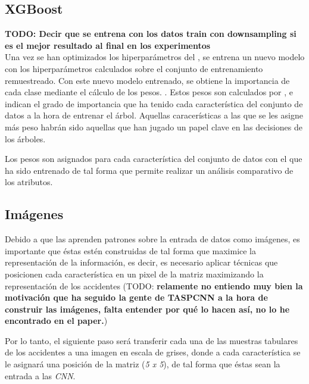 
    \subsection{XGBoost}


        \textbf{TODO: Decir que se entrena con los datos train con downsampling si es el mejor resultado al final en los experimentos}\\

        Una vez se han optimizados los hiperparámetros del , se entrena un nuevo modelo con los hiperparámetros calculados sobre el conjunto de entrenamiento remuestreado. Con este nuevo modelo  entrenado, se obtiene la importancia de cada clase mediante el cálculo de los pesos. \cite{XGBoostFeatureWeightsMeaning}. Estos pesos son calculados por , e indican el grado de importancia que ha tenido cada característica del conjunto de datos a la hora de entrenar el árbol. Aquellas caracerísticas a las que se les asigne más peso habrán sido aquellas que han jugado un papel clave en las decisiones de los árboles.

        Los pesos son asignados para cada característica del conjunto de datos con el que ha sido entrenado  de tal forma que permite realizar un análisis comparativo de los atributos.


    \subsection{Imágenes}


        Debido a que las  aprenden patrones sobre la entrada de datos como imágenes, es importante que éstas estén construidas de tal forma que maximice la representación de la información, es decir, es necesario aplicar técnicas que posicionen cada característica en un pixel de la matriz maximizando la representación de los accidentes (TODO: \textbf{relamente no entiendo muy bien la motivación que ha seguido la gente de TASPCNN a la hora de construir las imágenes, falta entender por qué lo hacen así, no lo he encontrado en el paper.})

        Por lo tanto, el siguiente paso será transferir cada una de las muestras tabulares de los accidentes a una imagen en escala de grises, donde a cada característica se le asignará una posición de la matriz (\textit{5 x 5}), de tal forma que éstas sean la entrada a las \textit{CNN}.

